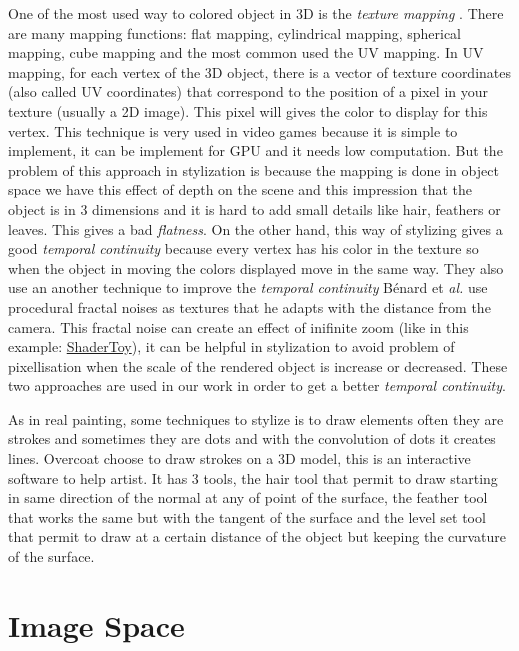 One of the most used way to colored object in 3D is the \textit{texture mapping} \cite{texture_mapping}. There are many mapping functions: flat mapping, cylindrical mapping, spherical mapping, cube mapping and the most common used the UV mapping. In UV mapping, for each vertex of the 3D object, there is a vector of texture coordinates (also called UV coordinates) that correspond to the position of a pixel in your texture (usually a 2D image). This pixel will gives the color to display for this vertex. This technique is very used in video games because it is simple to implement, it can be implement for GPU and it needs low computation. But the problem of this approach in stylization is because the mapping is done in object space we have this effect of depth on the scene and this impression that the object is in 3 dimensions and it is hard to add small details like hair, feathers or leaves. This gives a bad \textit{flatness}. On the other hand, this way of stylizing gives a good \textit{temporal continuity} \cite{benard_dynamic_2009} because every vertex has his color in the texture so when the object in moving the colors displayed move in the same way. They also use an another technique to improve the \textit{temporal continuity} Bénard et \textit{al.} \cite{benard_dynamic_2009} use procedural fractal noises as textures that he adapts with the distance from the camera. This fractal noise can create an effect of inifinite zoom (like in this example: \href{https://www.shadertoy.com/view/XlBXWw?fbclid=IwAR1fU2JxQzXtks1ZcmVmzrHiv646G8w2gWceeiV-UToeFkAFMQ2NecbsGGs}{ShaderToy}), it can be helpful in stylization to avoid problem of pixellisation when the scale of the rendered object is increase or decreased. These two approaches are used in our work in order to get a better \textit{temporal continuity}.


As in real painting, some techniques to stylize is to draw elements often they are strokes and sometimes they are dots and with the convolution of dots it creates lines. Overcoat\cite{schmid_overcoat:_2011} choose to draw strokes on a 3D model, this is an interactive software to help artist. It has 3 tools, the hair tool that permit to draw starting in same direction of the normal at any of point of the surface, the feather tool that works the same but with the tangent of the surface and the level set tool that permit to draw at a certain distance of the object but keeping the curvature of the surface.

\section{Image Space}
